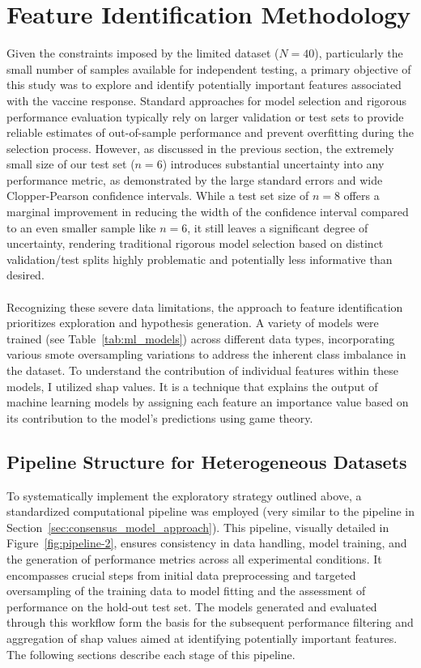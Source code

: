 \documentclass[12pt,a4paper]{report}
\begin{document}
\section{Feature Identification Methodology}
\noindent
Given the constraints imposed by the limited dataset ($N=40$), particularly the small number of samples available for independent testing, a primary objective of this study was to explore and identify potentially important features associated with the vaccine response. Standard approaches for model selection and rigorous performance evaluation typically rely on larger validation or test sets to provide reliable estimates of out-of-sample performance and prevent overfitting during the selection process. However, as discussed in the previous section, the extremely small size of our test set ($n=6$) introduces substantial uncertainty into any performance metric, as demonstrated by the large standard errors and wide Clopper-Pearson confidence intervals. While a test set size of $n=8$ offers a marginal improvement in reducing the width of the confidence interval compared to an even smaller sample like $n=6$, it still leaves a significant degree of uncertainty, rendering traditional rigorous model selection based on distinct validation/test splits highly problematic and potentially less informative than desired.\\
\\
Recognizing these severe data limitations, the approach to feature identification prioritizes exploration and hypothesis generation. A variety of models were trained (see Table~\ref{tab:ml_models}) across different data types, incorporating various \gls{smote} oversampling variations to address the inherent class imbalance in the dataset. To understand the contribution of individual features within these models, I utilized \acrfull{shap} \cite{ApprouchForModelPredictions} values. It is a technique that explains the output of machine learning models by assigning each feature an importance value based on its contribution to the model’s predictions using game theory.

\subsection{Pipeline Structure for Heterogeneous Datasets}
\label{subsec:pipeline_structure_for_Heterogeneous_datasets}
To systematically implement the exploratory strategy outlined above, a standardized computational pipeline was employed (very similar to the pipeline in Section~\ref{sec:consensus_model_approach}). This pipeline, visually detailed in Figure~\ref{fig:pipeline-2}, ensures consistency in data handling, model training, and the generation of performance metrics across all experimental conditions. It encompasses crucial steps from initial data preprocessing and targeted oversampling of the training data to model fitting and the assessment of performance on the hold-out test set. The models generated and evaluated through this workflow form the basis for the subsequent performance filtering and aggregation of \gls{shap} values aimed at identifying potentially important features. The following sections describe each stage of this pipeline.
\end{document}
